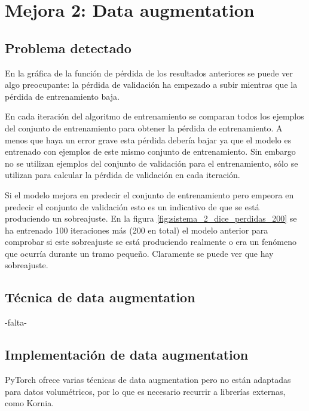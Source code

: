 \chapter{Mejora 2: Data augmentation}\label{data_augmentation}

\section{Problema detectado}\label{sec:data_augmentation_problem}

En la gráfica de la función de pérdida de los resultados anteriores se puede ver algo preocupante: la pérdida de validación ha empezado a subir mientras que la pérdida de entrenamiento baja.

En cada iteración del algoritmo de entrenamiento se comparan todos los ejemplos del conjunto de entrenamiento para obtener la pérdida de entrenamiento. A menos que haya un error grave esta pérdida debería bajar ya que el modelo es entrenado con ejemplos de este mismo conjunto de entrenamiento. Sin embargo no se utilizan ejemplos del conjunto de validación para el entrenamiento, sólo se utilizan para calcular la pérdida de validación en cada iteración.

Si el modelo mejora en predecir el conjunto de entrenamiento pero empeora en predecir el conjunto de validación esto es un indicativo de que se está produciendo un sobreajuste. En la figura \ref{fig:sistema_2_dice_perdidas_200} se ha entrenado 100 iteraciones más (200 en total) el modelo anterior para comprobar si este sobreajuste se está produciendo realmente o era un fenómeno que ocurría durante un tramo pequeño. Claramente se puede ver que hay sobreajuste.


\section{Técnica de data augmentation}\label{sec:data_augmentation_change}
-falta-
\section{Implementación de data augmentation}\label{sec:data_augmentation_change}

PyTorch ofrece varias técnicas de data augmentation pero no están adaptadas para datos volumétricos, por lo que es necesario recurrir a librerías externas, como Kornia.

